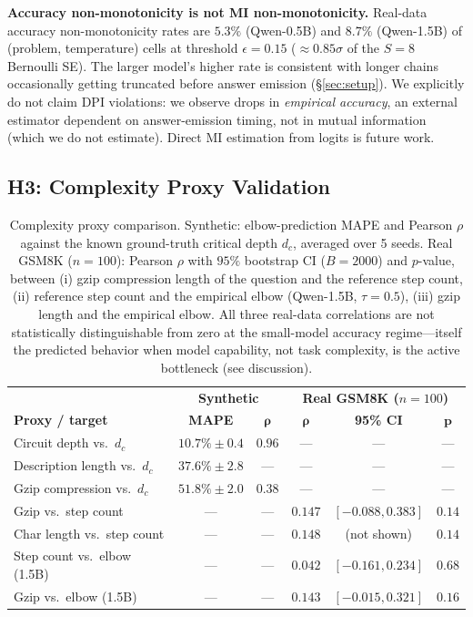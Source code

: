 \documentclass{article}
\begin{document}
\textbf{Accuracy non-monotonicity is not MI non-monotonicity.}  Real-data accuracy non-monotonicity rates are $5.3\%$ (Qwen-0.5B) and $8.7\%$ (Qwen-1.5B) of (problem, temperature) cells at threshold $\epsilon{=}0.15$ ($\approx 0.85\sigma$ of the $S{=}8$ Bernoulli SE).  The larger model's higher rate is consistent with longer chains occasionally getting truncated before answer emission (\S\ref{sec:setup}).  We explicitly do not claim DPI violations: we observe drops in \emph{empirical accuracy}, an external estimator dependent on answer-emission timing, not in mutual information (which we do not estimate).  Direct MI estimation from logits is future work.

\subsection{H3: Complexity Proxy Validation}
\label{sec:h3}

\begin{table}[t]
\centering
\caption{Complexity proxy comparison.  Synthetic: elbow-prediction MAPE and Pearson $\rho$ against the known ground-truth critical depth $d_c$, averaged over 5 seeds.  Real GSM8K ($n{=}100$): Pearson $\rho$ with $95\%$ bootstrap CI ($B{=}2000$) and $p$-value, between (i) gzip compression length of the question and the reference step count, (ii) reference step count and the empirical elbow (Qwen-1.5B, $\tau{=}0.5$), (iii) gzip length and the empirical elbow.  All three real-data correlations are not statistically distinguishable from zero at the small-model accuracy regime---itself the predicted behavior when model capability, not task complexity, is the active bottleneck (see discussion).}
\label{tab:h3}
\small
\begin{tabular}{lcc|ccc}
\toprule
& \multicolumn{2}{c|}{\textbf{Synthetic}} & \multicolumn{3}{c}{\textbf{Real GSM8K ($n{=}100$)}} \\
\textbf{Proxy / target} & \textbf{MAPE} & $\bm{\rho}$ & $\bm{\rho}$ & \textbf{95\% CI} & $\bm{p}$ \\
\midrule
Circuit depth vs.\ $d_c$       & $\bm{10.7\%} \pm 0.4$ & $\bm{0.96}$ & ---    & ---             & ---   \\
Description length vs.\ $d_c$  & $37.6\% \pm 2.8$      & ---          & ---    & ---             & ---   \\
Gzip compression vs.\ $d_c$    & $51.8\% \pm 2.0$      & $0.38$       & ---    & ---             & ---   \\
\midrule
Gzip vs.\ step count           & ---                   & ---          & $0.147$ & $[-0.088, 0.383]$ & $0.14$ \\
Char length vs.\ step count    & ---                   & ---          & $0.148$ & (not shown)        & $0.14$ \\
Step count vs.\ elbow (1.5B)   & ---                   & ---          & $0.042$ & $[-0.161, 0.234]$ & $0.68$ \\
Gzip vs.\ elbow (1.5B)         & ---                   & ---          & $0.143$ & $[-0.015, 0.321]$ & $0.16$ \\
\bottomrule
\end{tabular}
\end{table}
\end{document}
